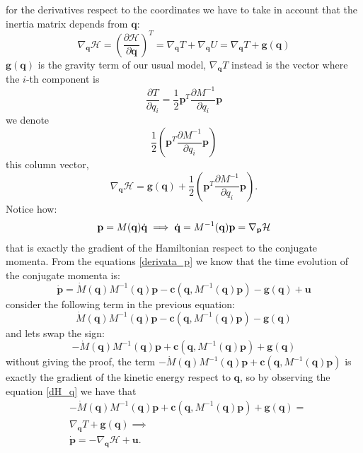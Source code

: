 \documentclass[10pt, a4paper]{report}
\newcommand{\q}{{\mathbf q}}
\begin{document}
for the derivatives respect to the coordinates we have to take in account that the inertia matrix depends from $\q$:\begin{equation}\label{dH_q}
     \nabla_\q\mathcal H =\left(\frac{\partial \mathcal H}{\partial \q}\right)^T=\nabla_\q T+\nabla_\q U=\nabla_\q T+\mathbf g(\q)
\end{equation}
$\mathbf g(\q)$ is the gravity term of our usual model, $\nabla_\q T$ instead is the vector where the $i$-th component is\begin{equation}
    \frac{\partial T}{\partial q_i}=\frac{1}{2}\mathbf p^T\frac{\partial M^{-1}}{\partial q_i}\mathbf p
\end{equation}
we denote $$\frac{1}{2}\left(\mathbf p^T\frac{\partial M^{-1}}{\partial q_i}\mathbf p\right) $$
this column vector,
\begin{equation}
     \nabla_\q\mathcal H =\mathbf g(\q)+\frac{1}{2}\left(\mathbf p^T\frac{\partial M^{-1}}{\partial q_i}\mathbf p\right).
\end{equation}
Notice how:\begin{equation}\label{first_hamilton}
    \mathbf p=M(\q)\dq\implies \dq=M^{-1}(\q)\mathbf p = \nabla_{\mathbf p}\mathcal H
\end{equation}
that is exactly the gradient of the Hamiltonian respect to the conjugate momenta. From the equations \eqref{derivata_p} we know that the time evolution of the conjugate momenta is:\begin{equation}
     \dot{\mathbf p} = \dot{M}(\q)M^{-1}(\q)\mathbf  p - \mathbf  c(\q, M^{-1}(\q)\mathbf p) -\mathbf  g(\mathbf q) +\mathbf  u
\end{equation}
consider the following term in the previous equation:
$$ 
\dot{M}(\q)M^{-1}(\q)\mathbf  p - \mathbf  c(\q, M^{-1}(\q)\mathbf p) -\mathbf  g(\mathbf q)
$$
and lets swap the sign:\begin{equation}
    -\dot{M}(\q)M^{-1}(\q)\mathbf  p + \mathbf  c(\q, M^{-1}(\q)\mathbf p) + \mathbf  g(\mathbf q)
\end{equation}
without giving the proof, the term $-\dot{M}(\q)M^{-1}(\q)\mathbf  p + \mathbf  c(\q, M^{-1}(\q)\mathbf p)$ is exactly the gradient of the kinetic energy respect to $\q$, so by observing the equation \eqref{dH_q} we have that\begin{align}
    &-\dot{M}(\q)M^{-1}(\q)\mathbf  p + \mathbf  c(\q, M^{-1}(\q)\mathbf p) + \mathbf  g(\mathbf q)=\\ 
    & \nabla_\q T+\mathbf g(\q)\implies \\
    &\label{second_hamilton} \dot{\mathbf p}=-\nabla_\q\mathcal H+\mathbf u.
\end{align}
\end{document}
